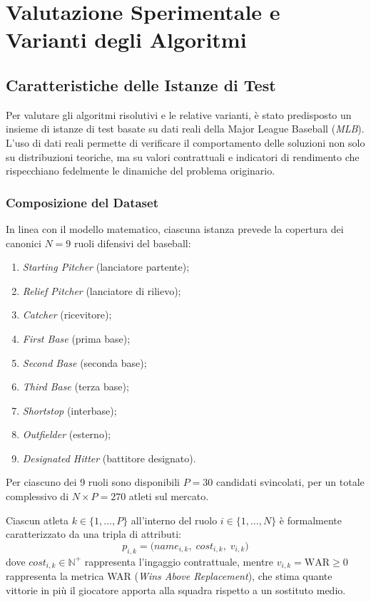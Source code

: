 \section{Valutazione Sperimentale e Varianti degli Algoritmi}

\subsection{Caratteristiche delle Istanze di Test}
Per valutare gli algoritmi risolutivi e le relative varianti, è stato predisposto un insieme di istanze di test basate su dati reali della Major League Baseball (\textit{MLB}). L'uso di dati reali permette di verificare il comportamento delle soluzioni non solo su distribuzioni teoriche, ma su valori contrattuali e indicatori di rendimento che rispecchiano fedelmente le dinamiche del problema originario.

\subsubsection{Composizione del Dataset}
In linea con il modello matematico, ciascuna istanza prevede la copertura dei canonici $N = 9$ ruoli difensivi del baseball:
\begin{enumerate}
	\item \textit{Starting Pitcher} (lanciatore partente);
	\item \textit{Relief Pitcher} (lanciatore di rilievo);
	\item \textit{Catcher} (ricevitore);
	\item \textit{First Base} (prima base);
	\item \textit{Second Base} (seconda base);
	\item \textit{Third Base} (terza base);
	\item \textit{Shortstop} (interbase);
	\item \textit{Outfielder} (esterno);
	\item \textit{Designated Hitter} (battitore designato).
\end{enumerate}
Per ciascuno dei 9 ruoli sono disponibili $P = 30$ candidati svincolati, per un totale complessivo di $N \times P = 270$ atleti sul mercato.

Ciascun atleta $k \in \{1, \dots, P\}$ all'interno del ruolo $i \in \{1, \dots, N\}$ è formalmente caratterizzato da una tripla di attributi:
\begin{equation}
	p_{i, k} = \big( \mathit{name}_{i, k}, \; \mathit{cost}_{i, k}, \; v_{i, k} \big)
\end{equation}
dove $\mathit{cost}_{i, k} \in \mathbb{N}^+$ rappresenta l'ingaggio contrattuale, mentre $v_{i, k} = \text{WAR} \ge 0$ rappresenta la metrica WAR (\textit{Wins Above Replacement}), che stima quante vittorie in più il giocatore apporta alla squadra rispetto a un sostituto medio.

